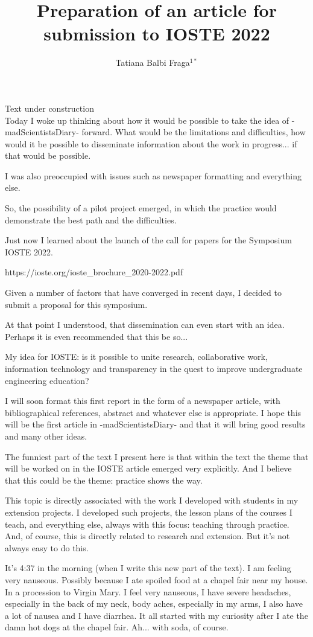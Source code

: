 \documentclass{book}
\title{Preparation of an article for submission to IOSTE 2022}
\author{Tatiana Balbi Fraga$^{1*}$}
\begin{document}
Text under construction \\

Today I woke up thinking about how it would be possible to take the idea of -madScientistsDiary- forward. What would be the limitations and difficulties, how would it be possible to disseminate information about the work in progress... if that would be possible.

I was also preoccupied with issues such as newspaper formatting and everything else.

So, the possibility of a pilot project emerged, in which the practice would demonstrate the best path and the difficulties.

Just now I learned about the launch of the call for papers for the Symposium IOSTE 2022.

https://ioste.org/ioste\_brochure\_2020-2022.pdf

Given a number of factors that have converged in recent days, I decided to submit a proposal for this symposium.

At that point I understood, that dissemination can even start with an idea. Perhaps it is even recommended that this be so...

My idea for IOSTE: is it possible to unite research, collaborative work, information technology and transparency in the quest to improve undergraduate engineering education?

I will soon format this first report in the form of a newspaper article, with bibliographical references, abstract and whatever else is appropriate. I hope this will be the first article in -madScientistsDiary- and that it will bring good results and many other ideas.

The funniest part of the text I present here is that within the text the theme that will be worked on in the IOSTE article emerged very explicitly. And I believe that this could be the theme: practice shows the way.

This topic is directly associated with the work I developed with students in my extension projects. I developed such projects, the lesson plans of the courses I teach, and everything else, always with this focus: teaching through practice. And, of course, this is directly related to research and extension. But it's not always easy to do this.

It's 4:37 in the morning (when I write this new part of the text). I am feeling very nauseous. Possibly because I ate spoiled food at a chapel fair near my house. In a procession to Virgin Mary. I feel very nauseous, I have severe headaches, especially in the back of my neck, body aches, especially in my arms, I also have a lot of nausea and I have diarrhea. It all started with my curiosity after I ate the damn hot dogs at the chapel fair. Ah... with soda, of course.
\end{document}
